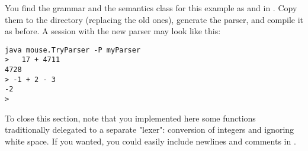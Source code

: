 You find the grammar and the semantics class for this example
as  and  in .
Copy them to the  directory (replacing the old ones),
generate the parser, and compile it as before.
A session with the new parser may look like this:

\small
\begin{Verbatim}[samepage=true,xleftmargin=15mm,baselinestretch=0.8]
java mouse.TryParser -P myParser
>   17 + 4711
4728
> -1 + 2 - 3
-2
>
\end{Verbatim}
\normalsize

To close this section, note that you implemented here some functions
traditionally delegated to a separate "lexer": conversion of integers
and ignoring white space.
If you wanted, you could easily include newlines and comments in \Space.




